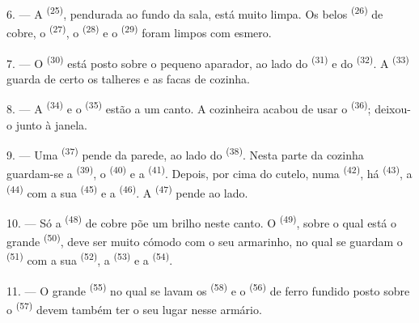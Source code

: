 \VUsaut{4.0mm}
\VUsaut{3.0mm}

6. --- A  \textsuperscript{(25)}, pendurada ao fundo da
sala, está muito limpa. Os belos  \textsuperscript{(26)} de cobre, o
 \textsuperscript{(27)}, o  \textsuperscript{(28)} e o
 \textsuperscript{(29)} foram limpos com esmero.

7. --- O  \textsuperscript{(30)} está posto sobre o pequeno
aparador, ao lado do  \textsuperscript{(31)} e do  \textsuperscript{(32)}. A  \textsuperscript{(33)} guarda de certo
os talheres e as facas de cozinha.

8. --- A  \textsuperscript{(34)} e o 
\textsuperscript{(35)} estão a um canto. A cozinheira acabou de usar o
 \textsuperscript{(36)}; deixou-o junto à janela.

9. --- Uma  \textsuperscript{(37)} pende da parede, ao lado
do  \textsuperscript{(38)}. Nesta parte da cozinha guardam-se a
 \textsuperscript{(39)}, o 
\textsuperscript{(40)} e a  \textsuperscript{(41)}. Depois, por
cima do cutelo, numa  \textsuperscript{(42)}, há
 \textsuperscript{(43)}, a  \textsuperscript{(44)} com a
sua  \textsuperscript{(45)} e a  \textsuperscript{(46)}. A
 \textsuperscript{(47)} pende ao lado.

10. --- Só a  \textsuperscript{(48)} de cobre põe um brilho neste
canto. O  \textsuperscript{(49)}, sobre o qual está o grande
 \textsuperscript{(50)}, deve ser muito cómodo com o seu
armarinho, no qual se guardam o 
\textsuperscript{(51)} com a sua  \textsuperscript{(52)}, a
 \textsuperscript{(53)} e a 
\textsuperscript{(54)}.

\VUsaut{4.0mm}
\VUsaut{3.0mm}

11. --- O grande  \textsuperscript{(55)} no qual se lavam os
 \textsuperscript{(58)} e o  \textsuperscript{(56)} de
ferro fundido posto sobre o  \textsuperscript{(57)} devem também
ter o seu lugar nesse armário.

